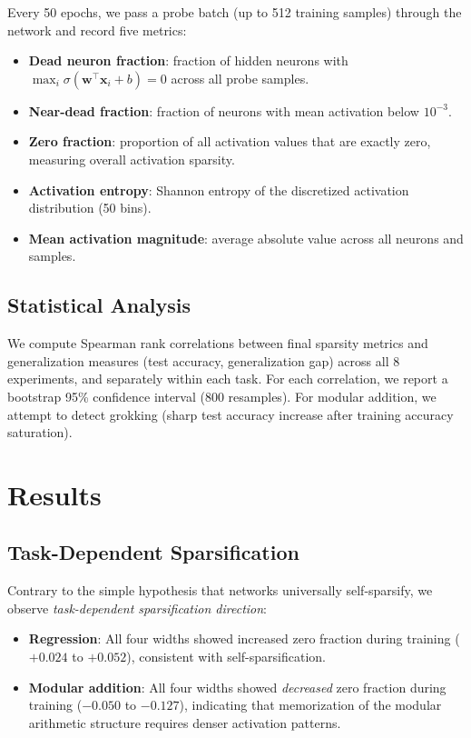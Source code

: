 \documentclass[11pt,a4paper]{article}
\begin{document}
Every 50 epochs, we pass a probe batch (up to 512 training samples)
through the network and record five metrics:
\begin{itemize}
  \item \textbf{Dead neuron fraction}: fraction of hidden neurons with
    $\max_i \sigma(\mathbf{w}^\top \mathbf{x}_i + b) = 0$ across all
    probe samples.
  \item \textbf{Near-dead fraction}: fraction of neurons with mean
    activation below $10^{-3}$.
  \item \textbf{Zero fraction}: proportion of all activation values that
    are exactly zero, measuring overall activation sparsity.
  \item \textbf{Activation entropy}: Shannon entropy of the discretized
    activation distribution (50 bins).
  \item \textbf{Mean activation magnitude}: average absolute value across
    all neurons and samples.
\end{itemize}

\subsection{Statistical Analysis}

We compute Spearman rank correlations between final sparsity metrics
and generalization measures (test accuracy, generalization gap) across
all 8 experiments, and separately within each task. For each correlation,
we report a bootstrap 95\% confidence interval (800 resamples).
For modular addition, we attempt to detect grokking (sharp test accuracy
increase after training accuracy saturation).

\section{Results}

\subsection{Task-Dependent Sparsification}

Contrary to the simple hypothesis that networks universally self-sparsify,
we observe \emph{task-dependent sparsification direction}:

\begin{itemize}
  \item \textbf{Regression}: All four widths showed increased zero fraction
    during training ($+0.024$ to $+0.052$), consistent with self-sparsification.
  \item \textbf{Modular addition}: All four widths showed \emph{decreased}
    zero fraction during training ($-0.050$ to $-0.127$), indicating that
    memorization of the modular arithmetic structure requires denser
    activation patterns.
\end{itemize}
\end{document}
